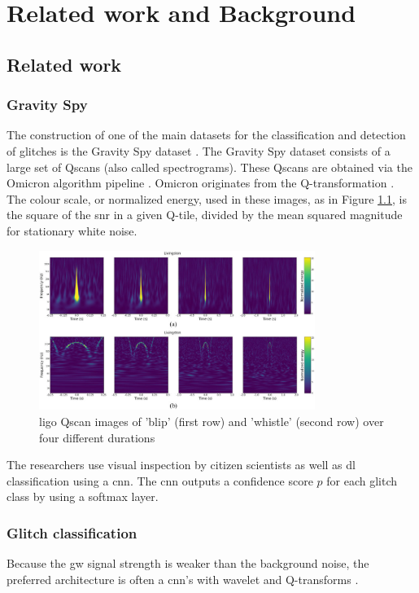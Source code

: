 \chapter{Related work and Background}
\label{ch-RelatedWork}
\section{Related work}
\subsection{Gravity Spy}
The construction of one of the main datasets for the classification and detection of glitches is the Gravity Spy dataset \citep{zevin2017gravity, glanzer2023data}. 
The Gravity Spy dataset consists of a large set of Qscans (also called spectrograms). These Qscans are obtained via the Omicron algorithm pipeline \citep{robinet2020omicron}. Omicron originates from the Q-transformation \citep{chatterji2004multiresolution}. The colour scale, or normalized energy, used in these images, as in Figure \ref{fig:spectrogram_examples}, is the square of the \acrshort{snr} in a given Q-tile, divided by the mean squared magnitude for stationary white noise.
\begin{figure}[H]
    \centering
    \includegraphics[width=0.8\textwidth]{Images/omegascan_examples.jpg}
    \caption{\acrshort{ligo} Qscan images of 'blip' (first row) and 'whistle' (second row) over four different durations \citep{zevin2017gravity}}
    \label{fig:spectrogram_examples}
\end{figure}
The researchers use visual inspection by citizen scientists as well as \acrshort{dl} classification using a \acrshort{cnn}. The \acrshort{cnn} outputs a confidence score $p$ for each glitch class by using a softmax layer. \\

\subsection{Glitch classification}
Because the \acrshort{gw} signal strength is weaker than the background noise, the preferred architecture is often a \acrshort{cnn}'s with wavelet and Q-transforms \cite{cuoco2020enhancing}. 

